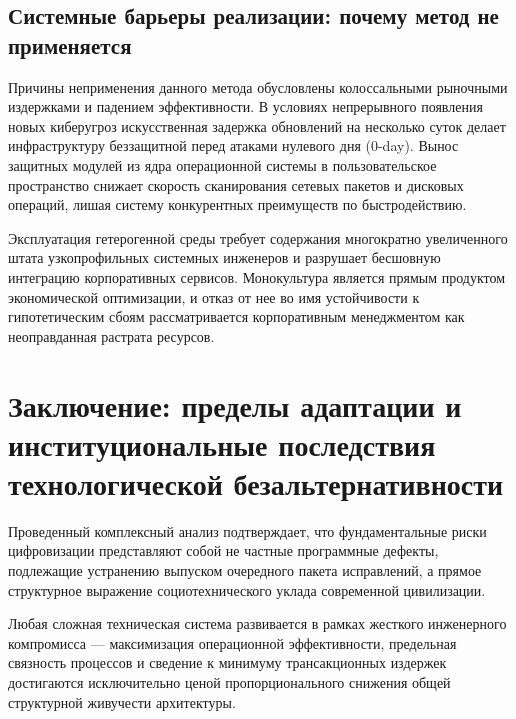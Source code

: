 \documentclass[12pt,a4paper]{article}
\begin{document}
\subsection{Системные барьеры реализации: почему метод не применяется}

Причины неприменения данного метода обусловлены колоссальными рыночными 
издержками и падением эффективности. В условиях непрерывного появления 
новых киберугроз искусственная задержка обновлений на несколько суток 
делает инфраструктуру беззащитной перед атаками нулевого дня ($0$-day). 
Вынос защитных модулей из ядра операционной системы в пользовательское 
пространство снижает скорость сканирования сетевых пакетов и дисковых 
операций, лишая систему конкурентных преимуществ по быстродействию.

Эксплуатация гетерогенной среды требует содержания многократно 
увеличенного штата узкопрофильных системных инженеров и разрушает 
бесшовную интеграцию корпоративных сервисов. Монокультура является 
прямым продуктом экономической оптимизации, и отказ от нее во имя 
устойчивости к гипотетическим сбоям рассматривается корпоративным 
менеджментом как неоправданная растрата ресурсов.

\section{Заключение: пределы адаптации и институциональные последствия 
технологической безальтернативности}

Проведенный комплексный анализ подтверждает, что фундаментальные риски 
цифровизации представляют собой не частные программные дефекты, 
подлежащие устранению выпуском очередного пакета исправлений, а прямое 
структурное выражение социотехнического уклада современной цивилизации. 

Любая сложная техническая система развивается в рамках жесткого 
инженерного компромисса --- максимизация операционной эффективности, 
предельная связность процессов и сведение к минимуму трансакционных 
издержек достигаются исключительно ценой пропорционального снижения 
общей структурной живучести архитектуры.
\end{document}
